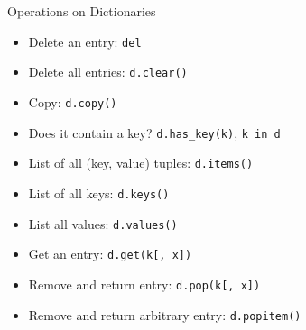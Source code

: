 \begin{frame}[fragile]{Operations on Dictionaries}
\begin{itemize}
\item Delete an entry: \lstinline{del}
\item Delete all entries: \lstinline{d.clear()}
\item Copy: \lstinline{d.copy()}
\item Does it contain a key? \lstinline{d.has_key(k)}, \lstinline{k in d}
\item List of all (key, value) tuples: \lstinline{d.items()}
\item List of all keys: \lstinline{d.keys()}
\item List all values: \lstinline{d.values()}
\item Get an entry: \lstinline{d.get(k[, x])}
\item Remove and return entry: \lstinline{d.pop(k[, x])}
\item Remove and return arbitrary entry:  \lstinline{d.popitem()}
\end{itemize}
\end{frame}



